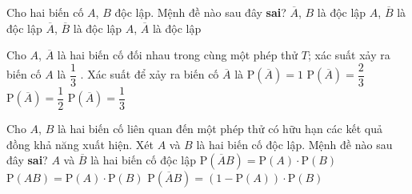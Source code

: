 

\begin{ex}%
	Cho hai biến cố $A$,  $B$ độc lập. Mệnh đề nào sau đây \textbf{sai}?
	 \choice
		{$\overline{A}$, $B$ là độc lập} 
		 {$A$, $\overline{B}$ là độc lập}
		{$\overline{A}$, $\overline{B}$  là độc lập}
		 {\True $A$, $\overline{A}$ là độc lập}
\end{ex}

\begin{ex}%
	Cho $A$, $\overline{A}$ là hai biến cố đối nhau trong cùng một phép thử $T$; xác suất xảy  ra biến cố $A$ là $\dfrac{1}{3}$ . Xác suất để xảy ra biến cố $\overline{A}$ là
	\choice 
		 {$\mathrm{P}\left(\overline{A}\right)=1$}
		{\True  $\mathrm{P}\left(\overline{A}\right)=\dfrac{2}{3}$}
		 {$\mathrm{P}\left(\overline{A}\right)=\dfrac{1}{2}$}
		 {$\mathrm{P}\left(\overline{A}\right)=\dfrac{1}{3}$}
\end{ex}

\begin{ex}%
	Cho $A$, $B$ là hai  biến cố liên quan đến một phép thử có hữu hạn các kết quả đồng khả năng xuất hiện. Xét $A$ và $B$ là hai biến cố độc lập. Mệnh đề nào sau đây \textbf{sai}?
	 \choice
		 {$A$ và $\overline{B}$ là hai biến cố độc lập}
		 {\True $\mathrm{P}\left(\overline{A}B\right)=\mathrm{P}(A)\cdot \mathrm{P}(B)$}
		{$\mathrm{P}(AB)=\mathrm{P}(A)\cdot  \mathrm{P}(B)$}
		 {$\mathrm{P}\left(\overline{A}B\right)=\left(1-\mathrm{P}(A)\right)\cdot \mathrm{P}(B)$}
\end{ex}

